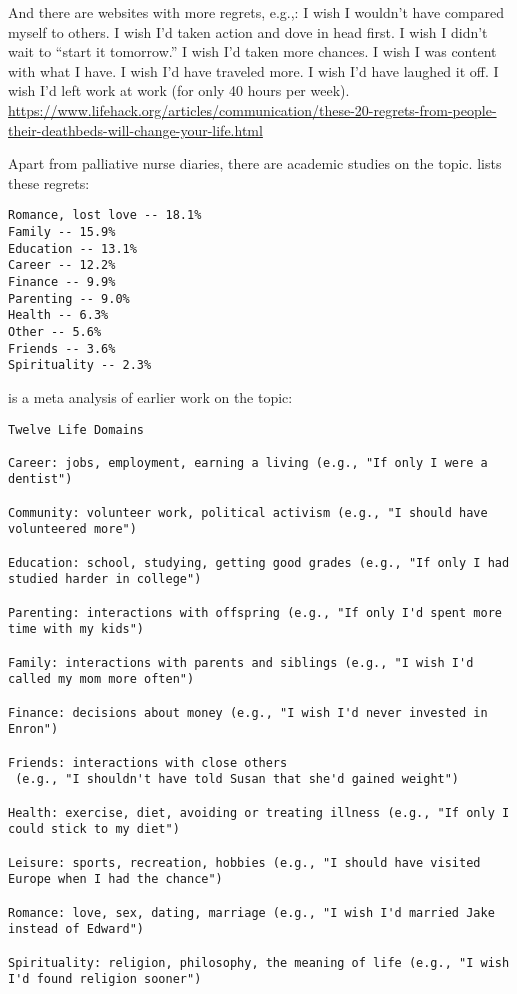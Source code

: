 \documentclass[10pt, letterpaper]{article}
\begin{document}
\begin{spacing}{1.8}
{And there are websites with more regrets, e.g.,:
I wish I wouldn't have compared myself to others.
I wish I'd taken action and dove in head first.
I wish I didn't wait to ``start it tomorrow.''
I wish I'd taken more chances.
I wish I was content with what I have.
I wish I'd have traveled more.
I wish I'd have laughed it off.
I wish I'd left work at work (for only 40 hours per week).
\url{https://www.lifehack.org/articles/communication/these-20-regrets-from-people-their-deathbeds-will-change-your-life.html}
}

Apart from palliative nurse diaries, there are  academic studies on
the topic. \citet{morrison11b} lists these regrets:

\begin{verbatim}
Romance, lost love -- 18.1%
Family -- 15.9%
Education -- 13.1%
Career -- 12.2%
Finance -- 9.9%
Parenting -- 9.0%
Health -- 6.3%
Other -- 5.6%
Friends -- 3.6%
Spirituality -- 2.3%
\end{verbatim}

\citet{roese05}  is a meta analysis of earlier work on the topic:
\begin{verbatim}
Twelve Life Domains

Career: jobs, employment, earning a living (e.g., "If only I were a dentist")

Community: volunteer work, political activism (e.g., "I should have volunteered more")

Education: school, studying, getting good grades (e.g., "If only I had studied harder in college")

Parenting: interactions with offspring (e.g., "If only I'd spent more time with my kids")

Family: interactions with parents and siblings (e.g., "I wish I'd called my mom more often")

Finance: decisions about money (e.g., "I wish I'd never invested in Enron")

Friends: interactions with close others 
 (e.g., "I shouldn't have told Susan that she'd gained weight")

Health: exercise, diet, avoiding or treating illness (e.g., "If only I could stick to my diet")

Leisure: sports, recreation, hobbies (e.g., "I should have visited Europe when I had the chance")

Romance: love, sex, dating, marriage (e.g., "I wish I'd married Jake instead of Edward")

Spirituality: religion, philosophy, the meaning of life (e.g., "I wish I'd found religion sooner")


\end{verbatim}
\end{spacing}
\end{document}
